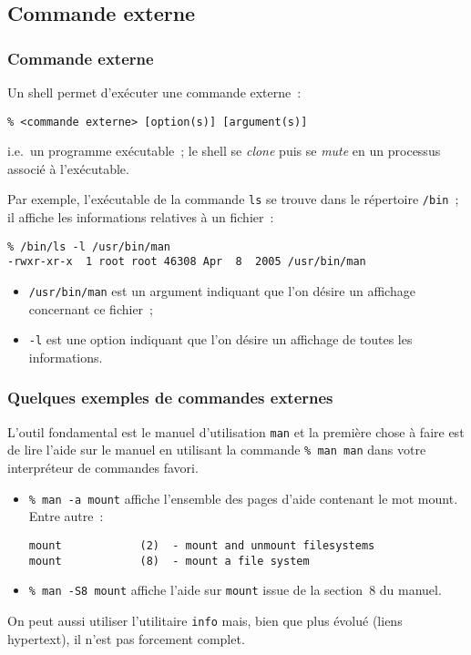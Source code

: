 \subsection{Commande externe}
\begin{frame}[fragile]
\frametitle{Commande externe}
  Un shell permet d'ex\'ecuter une commande externe~:
\begin{verbatim}
% <commande externe> [option(s)] [argument(s)]
\end{verbatim}
  i.e.\ un programme ex\'ecutable~; le shell se \emph{clone} puis se
  \emph{mute} en un processus associ\'e \`a l'ex\'ecutable.
  \par\medskip
  Par exemple, l'ex\'ecutable de la commande \texttt{ls} se trouve
  dans le r\'epertoire \texttt{/bin}~; il affiche les informations
  relatives \`a un fichier~:
\begin{verbatim}
% /bin/ls -l /usr/bin/man
-rwxr-xr-x  1 root root 46308 Apr  8  2005 /usr/bin/man
\end{verbatim}
  \begin{itemize}
  \item \texttt{/usr/bin/man} est un argument indiquant que l'on
    d\'esire un affichage concernant ce fichier~;
  \item \texttt{-l} est une option indiquant que l'on d\'esire un
    affichage de toutes les informations.
  \end{itemize}
\end{frame}
\begin{frame}[fragile]
  \frametitle{Quelques exemples de commandes externes}%
  L'outil fondamental est le manuel d'utilisation \texttt{man} et la
    premi\`ere chose  \`a  faire est de lire  l'aide  sur le manuel en
    utilisant la commande  \texttt{\% man man} dans votre interpr\'eteur
    de commandes favori.
    \begin{itemize}
  \item \texttt{\% man -a mount}  affiche  l'ensemble des  pages  d'aide
    contenant le mot mount. Entre autre~:
\begin{verbatim}
mount            (2)  - mount and unmount filesystems
mount            (8)  - mount a file system
\end{verbatim} 
  \item \texttt{\% man  -S8   mount} affiche  l'aide sur  \texttt{mount}
    issue de la section~$8$ du manuel.
  \end{itemize}
  On  peut aussi utiliser  l'utilitaire  \texttt{info} mais, bien  que
  plus \'evolu\'e (liens hypertext), il n'est pas forcement complet.
\end{frame}
